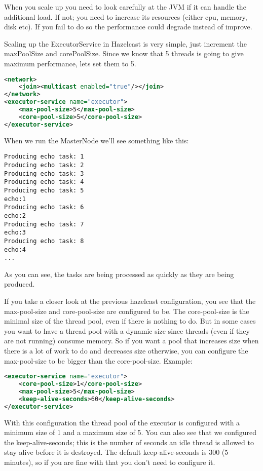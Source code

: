 When you scale up you need to look carefully at the JVM if it can handle the additional load. If not; you need to increase its resources (either cpu, memory, disk etc). If you fail to do so the performance could degrade instead of improve. 

Scaling up the ExecutorService in Hazelcast is very simple, just increment the maxPoolSize and corePoolSize. Since we know that 5 threads is going to give maximum performance, lets set them to 5.
\begin{lstlisting}[language=xml]
<network>
    <join><multicast enabled="true"/></join>
</network>
<executor-service name="executor">
    <max-pool-size>5</max-pool-size>
    <core-pool-size>5</core-pool-size>
</executor-service>
\end{lstlisting}
When we run the MasterNode we'll see something like this:
\begin{lstlisting}
Producing echo task: 1
Producing echo task: 2
Producing echo task: 3
Producing echo task: 4
Producing echo task: 5
echo:1
Producing echo task: 6
echo:2
Producing echo task: 7
echo:3
Producing echo task: 8
echo:4
...
\end{lstlisting}
As you can see, the tasks are being processed as quickly as they are being produced. 

If you take a closer look at the previous hazelcast configuration, you see that the max-pool-size and core-pool-size are configured to be. The core-pool-size is the minimal size of the thread pool, even if there is nothing to do. But in some cases you want to have a thread pool with a dynamic size since threads (even if they are not running) consume memory. So if you want a pool that increases size when there is a lot of work to do and decreases size otherwise, you can configure the max-pool-size to be bigger than the core-pool-size. Example:
\begin{lstlisting}[language=xml]
<executor-service name="executor">
    <core-pool-size>1</core-pool-size> 
    <max-pool-size>5</max-pool-size>
    <keep-alive-seconds>60</keep-alive-seconds>
</executor-service>
\end{lstlisting}
With this configuration the thread pool of the executor is configured with a minimum size of 1 and a maximum size of 5. You can also see that we configured the keep-alive-seconds; this is the number of seconds an idle thread is allowed to stay alive before it is destroyed. The default keep-alive-seconds is 300 (5 minutes), so if you are fine with that you don't need to configure it.

